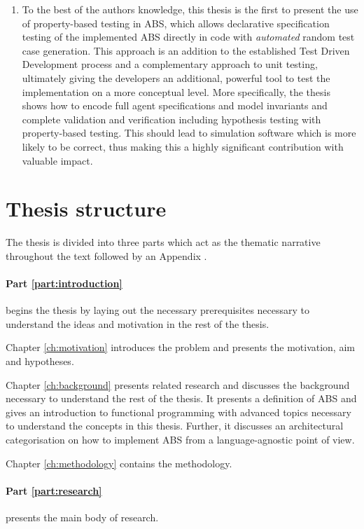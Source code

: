 \begin{enumerate}
	\item To the best of the authors knowledge, this thesis is the first to present the use of property-based testing in ABS, which allows declarative specification testing of the implemented ABS directly in code with \textit{automated} random test case generation. This approach is an addition to the established Test Driven Development process and a complementary approach to unit testing, ultimately giving the developers an additional, powerful tool to test the implementation on a more conceptual level. More specifically, the thesis shows how to encode full agent specifications and model invariants and complete validation and verification including hypothesis testing with property-based testing. This should lead to simulation software which is more likely to be correct, thus making this a highly significant contribution with valuable impact.
\end{enumerate}

\section{Thesis structure}
The thesis is divided into three parts which act as the thematic narrative throughout the text followed by an Appendix . 

\paragraph{Part \ref{part:introduction}} begins the thesis by laying out the necessary prerequisites necessary to understand the ideas and motivation in the rest of the thesis.
\medskip

Chapter \ref{ch:motivation} introduces the problem and presents the motivation, aim and hypotheses.

\medskip

Chapter \ref{ch:background} presents related research and discusses the background necessary to understand the rest of the thesis. It presents a definition of ABS and gives an introduction to functional programming with advanced topics necessary to understand the concepts in this thesis. Further, it discusses an architectural categorisation on how to implement ABS from a language-agnostic point of view.

\medskip

Chapter \ref{ch:methodology} contains the methodology.

\medskip

\paragraph{Part \ref{part:research}} presents the main body of research.

